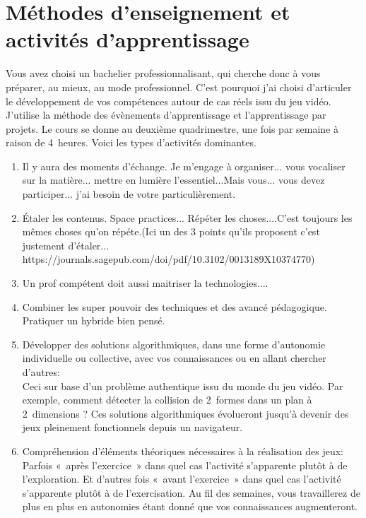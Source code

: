 \section{Méthodes d’enseignement et activités d’apprentissage}
Vous avez choisi un bachelier professionnalisant, qui cherche donc à vous préparer, au mieux, au mode professionnel. C’est  pourquoi j’ai choisi d’articuler le développement de vos compétences autour de cas réels issu du jeu vidéo. J'utilise la méthode des évènements d’apprentissage\cite{Leclercqevenements} et l'apprentissage par projets\cite{proulx2004apprentissage}.
Le cours se donne au deuxième quadrimestre, une fois par semaine à raison de 4~heures. Voici les types d'activités dominantes.
\begin{enumerate}
    \item Il y aura des moments d'échange. Je m'engage à organiser... vous vocaliser sur la matière... mettre en lumière l'essentiel...Mais vous... vous devez participer... j'ai besoin de votre particulièrement.
    \item Étaler les contenus. Space practices... Répéter les choses....C'est toujours les mêmes choses qu'on répéte.(Ici un des 3 points qu'ils proposent c'est justement d'étaler... https://journals.sagepub.com/doi/pdf/10.3102/0013189X10374770)
    \item Un prof compétent doit aussi maitriser la technologies....
    \item Combiner les super pouvoir des techniques et des avancé pédagogique. Pratiquer un hybride bien pensé.
    \item Développer des solutions algorithmiques, dans une forme d’autonomie individuelle ou collective, avec vos connaissances ou en allant chercher d’autres:\\Ceci sur base d’un problème authentique issu du monde du jeu vidéo. Par exemple, comment détecter la collision de 2~formes dans un plan à 2~dimensions ? Ces solutions algorithmiques évolueront jusqu'à devenir des jeux pleinement fonctionnels depuis un navigateur.
    \item Compréhension d'éléments théoriques nécessaires à la réalisation des jeux:\\Parfois «~après l’exercice~» dans quel cas l’activité s’apparente plutôt à de l’exploration. Et d’autres fois «~avant l’exercice~» dans quel cas l’activité s’apparente plutôt à de l’exercisation. Au fil des semaines, vous travaillerez de plus en plus en autonomies étant donné que vos connaissances augmenteront.

\end{enumerate}
